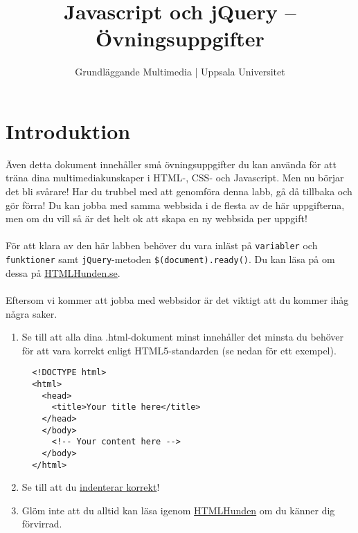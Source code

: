 \documentclass{article}
\begin{document}
  \title{ Javascript och jQuery -- Övningsuppgifter }
  \author{ Grundläggande Multimedia | Uppsala Universitet }
  \date{}
  \maketitle


  \section{ Introduktion }
    Även detta dokument innehåller små övningsuppgifter du kan använda för att träna dina multimediakunskaper i HTML-, CSS- och Javascript. Men nu börjar det bli svårare! Har du trubbel med att genomföra denna labb, gå då tillbaka och gör förra! Du kan jobba med samma webbsida i de flesta av de här uppgifterna, men om du vill så är det helt ok att skapa en ny webbsida per uppgift!
    \paragraph{}
    För att klara av den här labben behöver du vara inläst på \texttt{variabler} och \texttt{funktioner} samt \texttt{jQuery}-metoden \texttt{\$(document).ready()}. Du kan läsa på om dessa på \href{http://htmlhunden.se}{HTMLHunden.se}.

  \paragraph{}
  Eftersom vi kommer att jobba med webbsidor är det viktigt att du kommer ihåg några saker.
    \begin{enumerate}
      \item Se till att alla dina .html-dokument minst innehåller det minsta du behöver för att vara korrekt enligt HTML5-standarden (se nedan för ett exempel).
            \lstset{language=HTML}
            \begin{lstlisting}
  <!DOCTYPE html>
  <html>
    <head>
      <title>Your title here</title>
    </head>
    </body>
      <!-- Your content here -->
    </body>
  </html>
            \end{lstlisting}
      \item Se till att du \href{http://htmlhunden.se/#indentering}{indenterar korrekt}!
      \item Glöm inte att du alltid kan läsa igenom \href{http://htmlhunden.se}{HTMLHunden} om du känner dig förvirrad.
    \end{enumerate}
\end{document}

